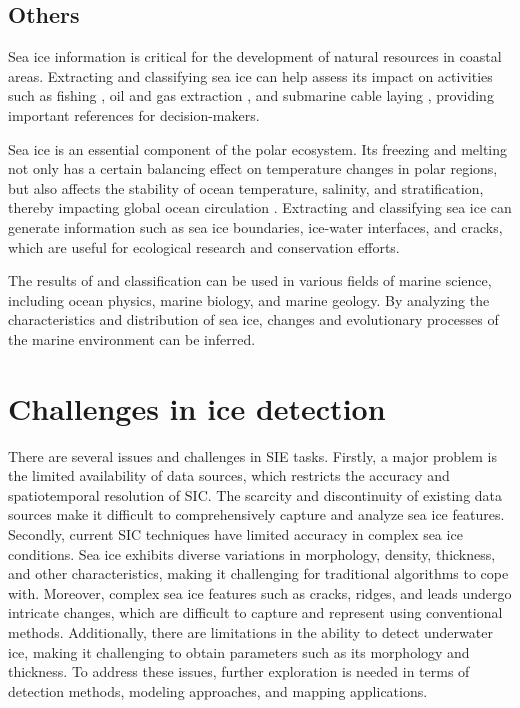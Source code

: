 \subsection{Others}
Sea ice information is critical for the development of natural resources in coastal areas. Extracting and classifying sea ice can help assess its impact on activities such as fishing \cite{180hunt2021will}, oil and gas extraction \cite{181desmond2019oil}, and submarine cable laying \cite{182taormina2018review}, providing important references for decision-makers.

Sea ice is an essential component of the polar ecosystem. Its freezing and melting not only has a certain balancing effect on temperature changes in polar regions, but also affects the stability of ocean temperature, salinity, and stratification, thereby impacting global ocean circulation \cite{183li2022impacts}. Extracting and classifying sea ice can generate information such as sea ice boundaries, ice-water interfaces, and cracks, which are useful for ecological research and conservation efforts.

The results of  and classification can be used in various fields of marine science\cite{184yan2020effect}\cite{185sreejith2022exploring}, including ocean physics, marine biology, and marine geology. By analyzing the characteristics and distribution of sea ice, changes and evolutionary processes of the marine environment can be inferred.




\section{Challenges in ice detection}
\label{section:E}
There are several issues and challenges in SIE tasks. Firstly, a major problem is the limited availability of data sources, which restricts the accuracy and spatiotemporal resolution of SIC. The scarcity and discontinuity of existing data sources make it difficult to comprehensively capture and analyze sea ice features. Secondly, current SIC techniques have limited accuracy in complex sea ice conditions. Sea ice exhibits diverse variations in morphology, density, thickness, and other characteristics, making it challenging for traditional algorithms to cope with. Moreover, complex sea ice features such as cracks, ridges, and leads undergo intricate changes, which are difficult to capture and represent using conventional methods. Additionally, there are limitations in the ability to detect underwater ice, making it challenging to obtain parameters such as its morphology and thickness. To address these issues, further exploration is needed in terms of detection methods, modeling approaches, and mapping applications.

